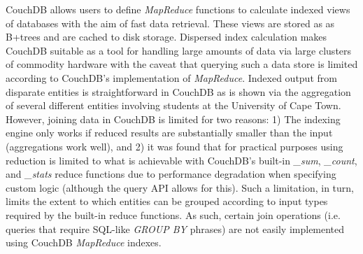CouchDB allows users to define \textit{MapReduce} functions to calculate indexed views of databases with the aim of fast data retrieval. These views are stored as as B+trees and are cached to disk storage. Dispersed index calculation makes CouchDB suitable as a tool for handling large amounts of data via large clusters of commodity hardware with the caveat that querying such a data store is limited according to CouchDB's implementation of \textit{MapReduce}. Indexed output from disparate entities is straightforward in CouchDB as is shown via the aggregation of several different entities involving students at the University of Cape Town. However, joining data in CouchDB is limited for two reasons: 1) The indexing engine only works if reduced results are substantially smaller than the input (aggregations work well), and 2) it was found that for practical purposes using reduction is limited to what is achievable with CouchDB's built-in \textit{\_sum}, \textit{\_count}, and \textit{\_stats} reduce functions due to performance degradation when specifying custom logic (although the query API allows for this). Such a limitation, in turn, limits the extent to which entities can be grouped according to input types required by the built-in reduce functions. As such, certain join operations (i.e. queries that require SQL-like \textit{GROUP BY} phrases) are not easily implemented using CouchDB \textit{MapReduce} indexes.